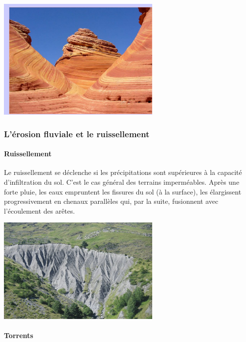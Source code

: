 \documentclass[a4paper,11pt]{article}
\begin{document}
\begin{center}
  \includegraphics[width=8cm]{Images/Erosion/erosion_eolienne.JPG}
\end{center}

\subsubsection{L'érosion fluviale et le ruissellement}

\paragraph{Ruissellement}

Le ruissellement se déclenche si les précipitations sont supérieures à la capacité d'infiltration du sol. C'est le cas général des terrains imperméables. 
Après une forte pluie, les eaux empruntent les fissures du sol (à la surface), les élargissent progressivement en chenaux parallèles qui, par la suite, fusionnent avec l'écoulement des arêtes.

\begin{center}
  \includegraphics[width=8cm]{Images/Erosion/bad_lands.jpg}
\end{center}

\paragraph{Torrents}
\end{document}
